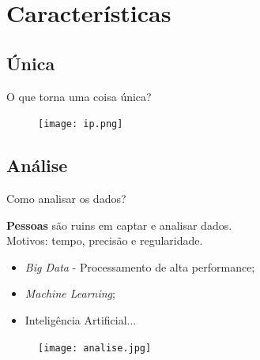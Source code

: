\section{Características}
\ncframesummary

\subsection*{Única}
\begin{frame}{O que torna uma coisa única?}
	
	\begin{figure}[H]
		\texttt{[image: ip.png]}\footnotemark
	\end{figure}
	
\end{frame}

\subsection*{Análise}
\begin{frame}{Como analisar os dados?}
	\begin{block}{}
		\textbf{Pessoas} são ruins em captar e analisar dados. \\Motivos: tempo, precisão e regularidade.
	\end{block}
	
	\begin{itemize}
		\item \textit{Big Data} - Processamento de alta performance;
		\item \textit{Machine Learning};
		\item Inteligência Artificial...
	\end{itemize}
	
	\begin{figure}[H]
		\texttt{[image: analise.jpg]}\footnotemark
	\end{figure}
	
\end{frame}

